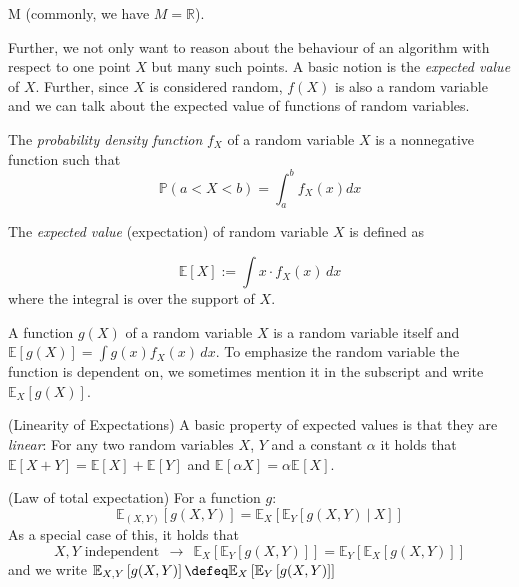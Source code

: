 \documentclass[
    a4paper, %
	fontsize=10pt, %
	twoside=false, %
]{kaobook}
\begin{document}
\begin{titlepage}
\begin{definition}
  \to M\) (commonly, we have \(M=\mathbb{R}\)).
\end{definition}
Further, we not only want to reason about the behaviour of an algorithm with respect to one point $X$ but many such points. A basic notion is the \textit{expected value} of $X$. Further, since $X$ is considered random, $f(X)$ is also a random variable and we can talk about the expected value of functions of random variables.
\begin{definition}
  The \textit{probability density function} $f_X$ of a random variable $X$ is a
  nonnegative function such that
  $$
  \mathbb{P}(a < X < b) = \int_a^b f_X(x) dx
  $$
\end{definition} 

\begin{definition}
  The \textit{expected value} (expectation) of random variable \(X\) is
  defined as
  
  \[ \mathbb{E}[X] := \int x \cdot
    f_X(x) \, dx
  \]
  where the integral is over the support of $X$. 
\end{definition}

  A function \(g(X)\) of a random variable \(X\) is a random variable itself and $\mathbb{E}[g(X)] = {\int g(x)f_X(x) \, dx}$. %
To emphasize the random
  variable the function is dependent on, we sometimes mention it in the
  subscript and write $\mathbb{E}_X[g(X)]$.

\begin{lemma} (Linearity of Expectations)
	A basic property of expected values is that they are \textit{linear}: For any two random variables $X$, $Y$ and a constant $\alpha$ it holds that $\mathbb{E}\left[ X + Y \right] = \mathbb{E}\left[ X \right] + \mathbb{E}_{}\left[ Y \right]$ and $\mathbb{E}_{}\left[ \alpha X \right] = \alpha \mathbb{E}_{}\left[ X \right]$.
\end{lemma}

\begin{lemma} (Law of total expectation)
  For a function $g$:
$$
\mathbb{E}_{(X,Y)}\left[ g(X,Y) \right] = \mathbb{E}_{X}\left[ \mathbb{E}_{Y}\left[ g(X,Y) ~|~ X \right]  \right] 
$$
As a special case of this, it holds that
$$
\text{$X,Y$ independent} ~ ~ \rightarrow ~ ~ 
\mathbb{E}_{X}\left[ \mathbb{E}_{Y}\left[ g(X,Y)  \right]  \right] 
=
\mathbb{E}_{Y}\left[ \mathbb{E}_{X}\left[ g(X,Y) \right]  \right] 
$$
and we write $\mathbb{E}_{X,Y}\left[ g(X,Y) \right] \defeq \mathbb{E}_{X}\left[ \mathbb{E}_{Y}\left[ g(X,Y) \right] \right]$
\end{lemma}


\end{titlepage}
\end{document}
